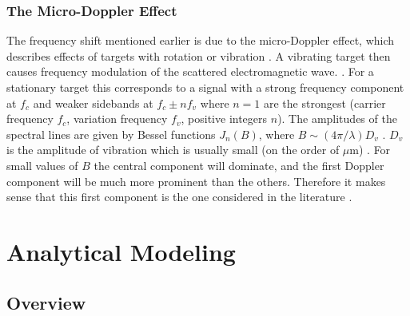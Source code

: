 \documentclass[11pt,twoside]{eitExjobb}
\begin{document}
	\subsection{The Micro-Doppler Effect}
	The frequency shift mentioned earlier is due to the micro-Doppler effect, which describes effects of targets with rotation or vibration \cite{Buerkle2007}. A vibrating target then causes frequency modulation of the scattered electromagnetic wave. \cite{Chen2006}. For a stationary target this corresponds to a signal with a strong frequency component at $f_c$ and weaker sidebands at $f_c \pm n f_v$ where $n=1$ are the strongest (carrier frequency $f_c$, variation frequency $f_v$, positive integers $n$). The amplitudes of the spectral lines are given by Bessel functions $J_n(B)$, where $B \sim (4\pi/\lambda)D_v$ \cite{Chen2006}. $D_v$ is the amplitude of vibration which is usually small (on the order of $\mu$m) \cite{Buerkle2007}\cite{Top2014}. For small values of $B$ the central component will dominate, and the first Doppler component will be much more prominent than the others. Therefore it makes sense that this first component is the one considered in the literature \cite{Buerkle2007}.
	
	\chapter{Analytical Modeling \label{ch:analytical}}
	
	\section{Overview}
	
\end{document}
